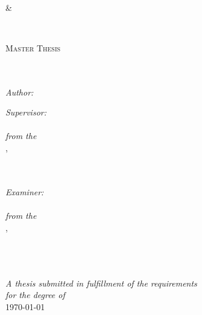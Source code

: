 
\begin{titlepage}
	\begin{center}

		{\scshape\LARGE \univone\\
			\&\par
			\univtwo\\
			\par}\vspace{1.5cm} %

		\textsc{\Large Master Thesis}\\[0.5cm] %

		\HRule \\[0.4cm] %
		{\huge \bfseries \ttitle\par}\vspace{0.4cm} %

		\HRule \\[1.5cm] %

		\large
		\emph{Author:}\\
		{\authorname} %
		\vspace{1cm}

		\large
		\emph{Supervisor:} \\
		\supname \\
		\textit{from the }\\
		\grouptwoname, \depttwo\\[0.1cm]
		\factwoname\\[0.1cm]
		\emph{\univtwo}\\
		\vspace{1cm}

		\large
		\emph{Examiner:} \\
		\examname \\
		\textit{from the }\\
		\groupname, \deptname\\[0.1cm]
		\facname\\[0.1cm]
		\emph{\univone}\\
		\vspace{1cm}

		\HRule \\[0.4cm]

		\large \textit{A thesis submitted in fulfillment of the requirements\\ for the degree of \degreename}\\[0.3cm]

		\vfill
		{\large \today}\\[2cm] %
	\end{center}
\end{titlepage}